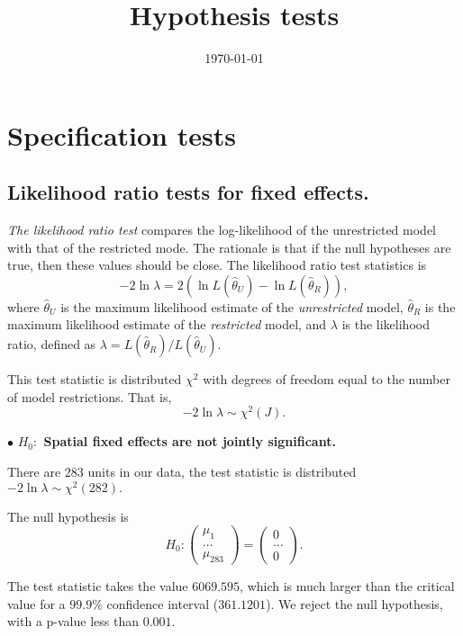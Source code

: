 \documentclass[11pt,a4paper]{amsart}
\theoremstyle{plain}
\theoremstyle{definition}
\begin{document}
\title{Hypothesis tests}
\date{\today}
\maketitle
\tableofcontents
\newpage
		
\section{Specification tests}
\subsection{Likelihood ratio tests for fixed effects. }\hfill\par
		
\textit{The likelihood ratio test} compares the log-likelihood of the unrestricted model with that of the restricted mode. The rationale is that if the null hypotheses are true, then these values should be close. The likelihood ratio test statistics is 
\[	-2 \ln \lambda = 2(\ln L(\hat{\theta}_{U}) - \ln L(\hat{\theta}_{R}) ),	\]
where $\hat{\theta}_{U}$ is the maximum likelihood estimate of the \emph{unrestricted} model, $\hat{\theta}_{R}$ is the maximum likelihood estimate of the \emph{restricted} model, and $\lambda$ is the likelihood ratio, defined as $\lambda = L(\hat{\theta}_{R}) / L(\hat{\theta}_{U})$.
		
This test statistic is distributed $\chi^{2}$ with degrees of freedom equal to the number of model restrictions. That is,
	\[	-2 \ln \lambda \sim \chi^{2}(J).	\]
		
$\bullet$ \textbf{$H_{0}:$ Spatial fixed effects are not jointly significant.} 
		
There are $283$ units in our data, the test statistic is distributed  $-2 \ln \lambda \sim \chi^{2}(282).$
		
The null hypothesis is 
\[	H_{0}: \begin{pmatrix}
		\mu_{1} \\
		\dots \\
		\mu_{283}
\end{pmatrix} = \begin{pmatrix}
		0 \\
		\dots \\
		0
\end{pmatrix}.	\]
		
The test statistic takes the value $6069.595$, which is much larger than the critical value for a $99.9\%$ confidence interval ($361.1201$). We reject the null hypothesis,  with a p-value less than $0.001$.
\end{document}
